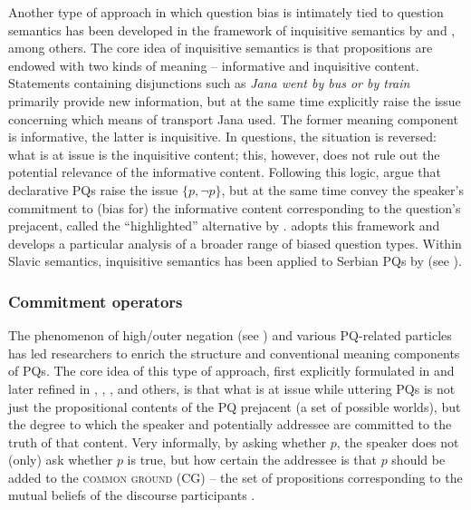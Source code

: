 \documentclass[output=paper,colorlinks,citecolor=brown]{langscibook}
\begin{document}
Another type of approach in which question bias is intimately tied to question semantics has been developed in the framework of inquisitive semantics \citep{Ciardelli.etal2013,Ciardelli.etal2019} by \citet{Farkas.Roelofsen2017} and \citet{AnderBois2019}, among others. The core idea of inquisitive semantics is that propositions are endowed with two kinds of meaning -- informative and inquisitive content. Statements containing disjunctions such as \textit{Jana went by bus or by train} primarily provide new information, but at the same time explicitly raise the issue concerning which means of transport Jana used. The former meaning component is informative, the latter is inquisitive. In questions, the situation is reversed: what is at issue is the inquisitive content; this, however, does not rule out the potential relevance of the informative content. Following this logic, \citet{Farkas.Roelofsen2017} argue that declarative PQs raise the issue $\{p,\neg p\}$, but at the same time convey the speaker's commitment to (bias for) the informative content corresponding to the question's prejacent, called the ``highlighted'' alternative by \citet{Farkas.Roelofsen2017}. \citet{AnderBois2019} adopts this framework and develops a particular analysis of a broader range of biased question types. Within Slavic semantics, inquisitive semantics has been applied to Serbian PQs by \citet{Todorovic2023} (see ).

\subsubsection{Commitment operators}\label{sim:sec:modelling-bias-comm}

The phenomenon of high/outer negation (see ) and various PQ-related particles has led researchers to enrich the structure and conventional meaning components of PQs. The core idea of this type of approach, first explicitly formulated in \citet{Romero.Han2004} and later refined in \citet{Repp2006,Repp2009,Repp2013}, \citet{Romero2015}, \citet{Krifka2015,Krifka2017}, and others, is that what is at issue while uttering PQs is not just the propositional contents of the PQ prejacent (a set of possible worlds), but the degree to which the speaker and potentially addressee are committed to the truth of that content. Very informally, by asking whether $p$, the speaker does not (only) ask whether $p$ is true, but how certain the addressee is that $p$ should be added to the \textsc{common ground} (CG) -- the set of propositions corresponding to the mutual beliefs of the discourse participants \citep{Stalnaker1978}.
\end{document}

